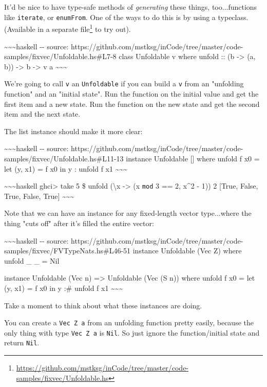 \documentclass[]{article}
\renewcommand{\href}[2]{#2\footnote{\url{#1}}}
\begin{document}
It'd be nice to have type-safe methods of \emph{generating} these things,
too...functions like \texttt{iterate}, or \texttt{enumFrom}. One of the ways to
do this is by using a typeclass. (Available in a
\href{https://github.com/mstksg/inCode/tree/master/code-samples/fixvec/Unfoldable.hs}{separate
file} to try out).

\textasciitilde{}\textasciitilde{}\textasciitilde{}haskell -\/- source:
https://github.com/mstksg/inCode/tree/master/code-samples/fixvec/Unfoldable.hs\#L7-8
class Unfoldable v where unfold :: (b -\textgreater{} (a, b)) -\textgreater{} b
-\textgreater{} v a \textasciitilde{}\textasciitilde{}\textasciitilde{}

We're going to call \texttt{v} an \texttt{Unfoldable} if you can build a
\texttt{v} from an "unfolding function" and an "initial state". Run the function
on the initial value and get the first item and a new state. Run the function on
the new state and get the second item and the next state.

The list instance should make it more clear:

\textasciitilde{}\textasciitilde{}\textasciitilde{}haskell -\/- source:
https://github.com/mstksg/inCode/tree/master/code-samples/fixvec/Unfoldable.hs\#L11-13
instance Unfoldable {[}{]} where unfold f x0 = let (y, x1) = f x0 in y : unfold
f x1 \textasciitilde{}\textasciitilde{}\textasciitilde{}

\textasciitilde{}\textasciitilde{}\textasciitilde{}haskell ghci\textgreater{}
take 5 \$ unfold (\textbackslash{}x -\textgreater{} (x \texttt{mod} 3 == 2,
x\^{}2 - 1)) 2 {[}True, False, True, False, True{]}
\textasciitilde{}\textasciitilde{}\textasciitilde{}

Note that we can have an instance for any fixed-length vector type...where the
thing "cuts off" after it's filled the entire vector:

\textasciitilde{}\textasciitilde{}\textasciitilde{}haskell -\/- source:
https://github.com/mstksg/inCode/tree/master/code-samples/fixvec/FVTypeNats.hs\#L46-51
instance Unfoldable (Vec Z) where unfold \_ \_ = Nil

instance Unfoldable (Vec n) =\textgreater{} Unfoldable (Vec (S n)) where unfold
f x0 = let (y, x1) = f x0 in y :\# unfold f x1
\textasciitilde{}\textasciitilde{}\textasciitilde{}

Take a moment to think about what these instances are doing.

You can create a \texttt{Vec\ Z\ a} from an unfolding function pretty easily,
because the only thing with type \texttt{Vec\ Z\ a} is \texttt{Nil}. So just
ignore the function/initial state and return \texttt{Nil}.
\end{document}
